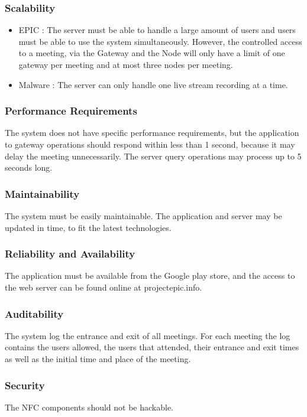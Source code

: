 \documentclass[a4paper,12pt,titlepage]{article}
\begin{document}
\subsubsection{Scalability}

\begin{itemize}
\item{EPIC} : The server must be able to handle a large amount of users and users must be able to use the system simultaneously. However, the controlled access to a meeting, via the Gateway and the Node will only have a limit of one gateway per meeting and at most three nodes per meeting.
\item{Malware} : The server can only handle one live stream recording at a time.
\end{itemize}
\subsubsection{Performance Requirements}
The system does not have specific performance requirements, but the application to gateway operations should respond within less than 1 second, because it may delay the meeting unnecessarily. The server query operations may process up to 5 seconds long.

\subsubsection{Maintainability}
The system must be easily maintainable. The application and server may be updated in time, to fit the latest technologies. 

\subsubsection{Reliability and Availability}
The application must be available from the Google play store, and the access to the web server can be found online at projectepic.info.

\subsubsection{Auditability}
The system log the entrance and exit of all meetings. For each meeting the log contains the users allowed, the users that attended, their entrance and exit times as well as the initial time and place of the meeting.

\subsubsection{Security}
The NFC components should not be hackable. 
\end{document}
